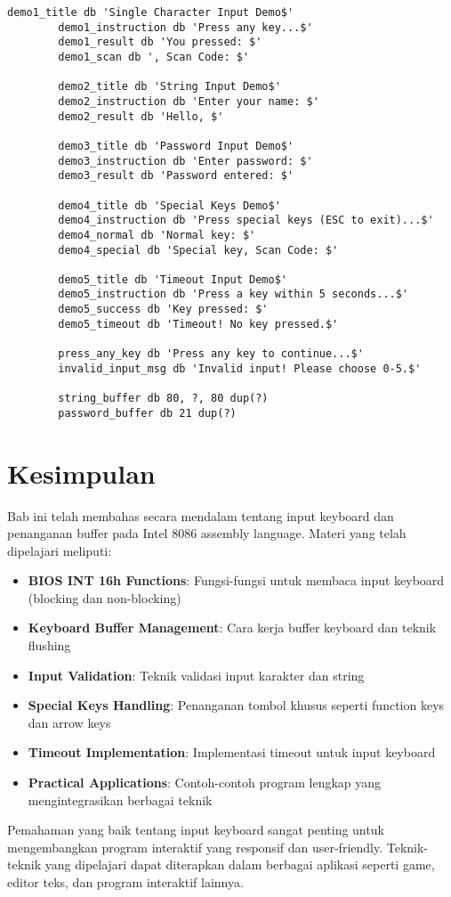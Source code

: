 \documentclass[../main.tex]{subfiles}
\begin{document}
\begin{lstlisting}[language={[x86masm]Assembler}, caption=Program Lengkap - Keyboard Input Demo, label={lst:complete-demo}]
        demo1_title db 'Single Character Input Demo$'
        demo1_instruction db 'Press any key...$'
        demo1_result db 'You pressed: $'
        demo1_scan db ', Scan Code: $'
        
        demo2_title db 'String Input Demo$'
        demo2_instruction db 'Enter your name: $'
        demo2_result db 'Hello, $'
        
        demo3_title db 'Password Input Demo$'
        demo3_instruction db 'Enter password: $'
        demo3_result db 'Password entered: $'
        
        demo4_title db 'Special Keys Demo$'
        demo4_instruction db 'Press special keys (ESC to exit)...$'
        demo4_normal db 'Normal key: $'
        demo4_special db 'Special key, Scan Code: $'
        
        demo5_title db 'Timeout Input Demo$'
        demo5_instruction db 'Press a key within 5 seconds...$'
        demo5_success db 'Key pressed: $'
        demo5_timeout db 'Timeout! No key pressed.$'
        
        press_any_key db 'Press any key to continue...$'
        invalid_input_msg db 'Invalid input! Please choose 0-5.$'
        
        string_buffer db 80, ?, 80 dup(?)
        password_buffer db 21 dup(?)
        \end{lstlisting}

    \section{Kesimpulan}
        Bab ini telah membahas secara mendalam tentang input keyboard dan penanganan buffer pada Intel 8086 assembly language. Materi yang telah dipelajari meliputi:

        \begin{itemize}
            \item \textbf{BIOS INT 16h Functions}: Fungsi-fungsi untuk membaca input keyboard (blocking dan non-blocking)
            \item \textbf{Keyboard Buffer Management}: Cara kerja buffer keyboard dan teknik flushing
            \item \textbf{Input Validation}: Teknik validasi input karakter dan string
            \item \textbf{Special Keys Handling}: Penanganan tombol khusus seperti function keys dan arrow keys
            \item \textbf{Timeout Implementation}: Implementasi timeout untuk input keyboard
            \item \textbf{Practical Applications}: Contoh-contoh program lengkap yang mengintegrasikan berbagai teknik
        \end{itemize}

        Pemahaman yang baik tentang input keyboard sangat penting untuk mengembangkan program interaktif yang responsif dan user-friendly. Teknik-teknik yang dipelajari dapat diterapkan dalam berbagai aplikasi seperti game, editor teks, dan program interaktif lainnya.
\end{document}
